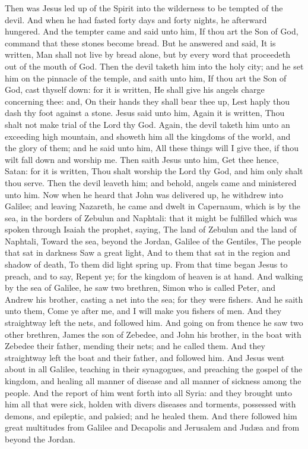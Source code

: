Then was Jesus led up of the Spirit into the wilderness to be tempted of the devil. And when he had fasted forty days and forty nights, he afterward hungered. And the tempter came and said unto him, If thou art the Son of God, command that these stones become bread. But he answered and said, It is written, Man shall not live by bread alone, but by every word that proceedeth out of the mouth of God. Then the devil taketh him into the holy city; and he set him on the pinnacle of the temple, and saith unto him, If thou art the Son of God, cast thyself down: for it is written, He shall give his angels charge concerning thee: and, On their hands they shall bear thee up, Lest haply thou dash thy foot against a stone.  Jesus said unto him, Again it is written, Thou shalt not make trial of the Lord thy God. Again, the devil taketh him unto an exceeding high mountain, and showeth him all the kingdoms of the world, and the glory of them; and he said unto him, All these things will I give thee, if thou wilt fall down and worship me. Then saith Jesus unto him, Get thee hence, Satan: for it is written, Thou shalt worship the Lord thy God, and him only shalt thou serve. Then the devil leaveth him; and behold, angels came and ministered unto him.  Now when he heard that John was delivered up, he withdrew into Galilee; and leaving Nazareth, he came and dwelt in Capernaum, which is by the sea, in the borders of Zebulun and Naphtali: that it might be fulfilled which was spoken through Isaiah the prophet, saying,  The land of Zebulun and the land of Naphtali, Toward the sea, beyond the Jordan, Galilee of the Gentiles,  The people that sat in darkness Saw a great light, And to them that sat in the region and shadow of death, To them did light spring up.  From that time began Jesus to preach, and to say, Repent ye; for the kingdom of heaven is at hand.  And walking by the sea of Galilee, he saw two brethren, Simon who is called Peter, and Andrew his brother, casting a net into the sea; for they were fishers. And he saith unto them, Come ye after me, and I will make you fishers of men. And they straightway left the nets, and followed him. And going on from thence he saw two other brethren, James the son of Zebedee, and John his brother, in the boat with Zebedee their father, mending their nets; and he called them. And they straightway left the boat and their father, and followed him.  And Jesus went about in all Galilee, teaching in their synagogues, and preaching the gospel of the kingdom, and healing all manner of disease and all manner of sickness among the people. And the report of him went forth into all Syria: and they brought unto him all that were sick, holden with divers diseases and torments, possessed with demons, and epileptic, and palsied; and he healed them. And there followed him great multitudes from Galilee and Decapolis and Jerusalem and Judæa and from beyond the Jordan. 

